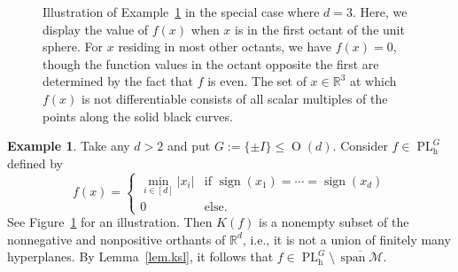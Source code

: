 \documentclass{article}
\theoremstyle{plain}
\theoremstyle{definition}
\newtheorem{example}[theorem]{Example}
\begin{document}
\begin{figure}[t]
\caption{Illustration of Example~\ref{ex.ksl} in the special case where $d=3$. Here, we display the value of $f(x)$ when $x$ is in the first octant of the unit sphere. For $x$ residing in most other octants, we have $f(x)=0$, though the function values in the octant opposite the first are determined by the fact that $f$ is even. The set of $x\in\mathbb{R}^3$ at which $f(x)$ is not differentiable consists of all scalar multiples of the points along the solid black curves.}
\label{fig:PL_example}
\end{figure}

\begin{example}
\label{ex.ksl}
Take any $d>2$ and put $G := \{ \pm  I \} \leq \operatorname{O}(d)$.
Consider $f\in\operatorname{PL}_{\operatorname{h}}^G$ defined by
\[
f(x)
=\left\{\begin{array}{cl}\displaystyle\min_{i\in[d]}|x_i| &\text{if }\operatorname{sign}(x_1)=\cdots=\operatorname{sign}(x_d)\\[12 pt]
0&\text{else}.
\end{array}\right.
\]
See Figure~\ref{fig:PL_example} for an illustration.
Then $K(f)$ is a nonempty subset of the nonnegative and nonpositive orthants of $\mathbb{R}^d$, i.e., it is not a union of finitely many hyperplanes.
By Lemma~\ref{lem.ksl}, it follows that $f
\in\operatorname{PL}_{\operatorname{h}}^G\setminus\,\overline{\operatorname{span}\mathcal{M}}$.
\end{example}
\end{document}
